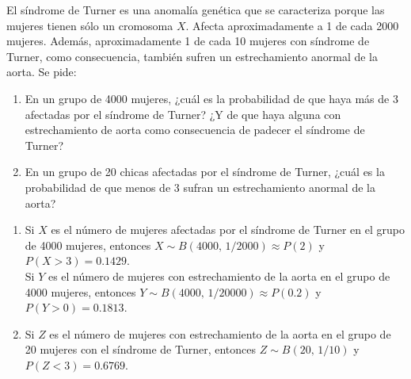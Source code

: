 {El síndrome de Turner es una anomalía genética que se caracteriza porque las mujeres tienen sólo un cromosoma $X$.
Afecta aproximadamente a 1 de cada 2000 mujeres.
Además, aproximadamente 1 de cada 10 mujeres con síndrome de Turner, como consecuencia, también sufren un
estrechamiento anormal de la aorta.
Se pide:
\begin{enumerate}
\item En un grupo de 4000 mujeres, ¿cuál es la probabilidad de que haya más de 3 afectadas por el síndrome de Turner?
¿Y de que haya alguna con estrechamiento de aorta como consecuencia de padecer el síndrome de Turner?
\item En un grupo de 20 chicas afectadas por el síndrome de Turner, ¿cuál es la probabilidad de que menos de 3 sufran
un estrechamiento anormal de la aorta?
\end{enumerate}
}
{
\begin{enumerate}
\item Si $X$ es el número de mujeres afectadas por el síndrome de Turner en el grupo de 4000 mujeres, entonces $X\sim
B(4000,\,1/2000)\approx P(2)$ y $P(X>3)=0.1429$.\\
Si $Y$ es el número de mujeres con estrechamiento de la aorta en el grupo de 4000 mujeres, entonces $Y\sim
B(4000,\,1/20000)\approx P(0.2)$ y $P(Y>0)=0.1813$.
\item Si $Z$ es el número de mujeres con estrechamiento de la aorta en el grupo de 20 mujeres con el síndrome de
Turner, entonces $Z\sim B(20,\,1/10)$ y $P(Z<3)=0.6769$.
\end{enumerate}
}
{}


